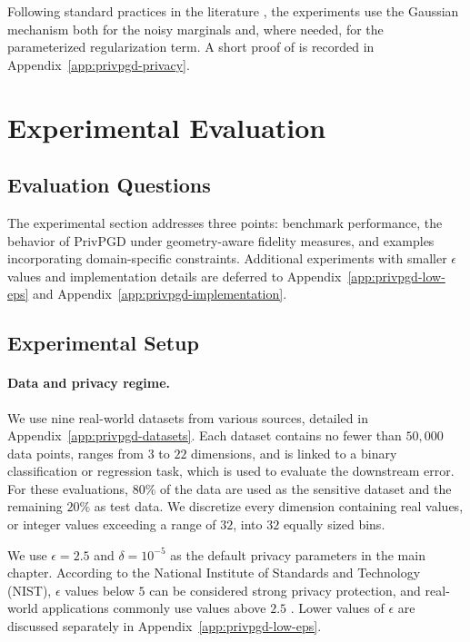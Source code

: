 Following standard practices in the literature \citep{mst,aim,vietri2022private}, the experiments use the Gaussian mechanism both for the noisy marginals and, where needed, for the parameterized regularization term. A short proof of  is recorded in Appendix~\ref{app:privpgd-privacy}.

\section{Experimental Evaluation}

\subsection{Evaluation Questions}

The experimental section addresses three points: benchmark performance, the behavior of PrivPGD under geometry-aware fidelity measures, and examples incorporating domain-specific constraints. Additional experiments with smaller \(\epsilon\) values and implementation details are deferred to Appendix~\ref{app:privpgd-low-eps} and Appendix~\ref{app:privpgd-implementation}.

\subsection{Experimental Setup}

\paragraph{Data and privacy regime.}
We use nine real-world datasets from various sources, detailed in Appendix~\ref{app:privpgd-datasets}. Each dataset contains no fewer than \(50{,}000\) data points, ranges from \(3\) to \(22\) dimensions, and is linked to a binary classification or regression task, which is used to evaluate the downstream error. For these evaluations, \(80\%\) of the data are used as the sensitive dataset and the remaining \(20\%\) as test data. We discretize every dimension containing real values, or integer values exceeding a range of \(32\), into \(32\) equally sized bins.

We use \(\epsilon = 2.5\) and \(\delta = 10^{-5}\) as the default privacy parameters in the main chapter. According to the National Institute of Standards and Technology (NIST), \(\epsilon\) values below \(5\) can be considered strong privacy protection, and real-world applications commonly use values above \(2.5\) \citep{NIST-diff-privacy}. Lower values of \(\epsilon\) are discussed separately in Appendix~\ref{app:privpgd-low-eps}.

